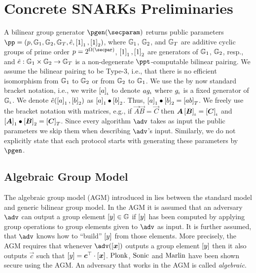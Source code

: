 \section{Concrete SNARKs Preliminaries}

A bilinear group generator $\pgen (\secparam)$ returns public parameters $ \pp =
(p, \GRP_1, \GRP_2, \GRP_T, \pair, \gone{1}, \gtwo{1})$, where $\mathbb{G}_1$,
$\mathbb{G}_2$, and $\mathbb{G}_T$ are additive cyclic groups of prime order $p = 2^{\Omega
  (\secpar)}$, $\left[1\right]_{1}, \left[1\right]_{2}$ are generators of $\mathbb{G}_1$, $\mathbb{G}_2$, resp.,
and $\hat{e}: \mathbb{G}_1 \times \mathbb{G}_2 \to \mathbb{G}_T$ is a non-degenerate
$\ppt$-computable bilinear pairing. We assume the bilinear pairing to be Type-3,
i.e., that there is no efficient isomorphism from $\mathbb{G}_1$ to $\mathbb{G}_2$ or from
$\mathbb{G}_2$ to $\mathbb{G}_1$. We use the by now standard bracket notation, i.e., we
write $\left[a\right]_{\iota}$ to denote $a g_{\iota}$ where $g_{\iota}$ is a fixed generator
of $\mathbb{G}_{\iota}$. We denote $\hat{e} (\left[a\right]_{1}, \left[b\right]_{2})$ as $\left[a\right]_{1} \bullet
\left[b\right]_{2}$. Thus, $\left[a\right]_{1} \bullet \left[b\right]_{2} = \left[a b\right]_{T}$. We freely use the
bracket notation with matrices, e.g., if $\vec{A} \vec{B} = \vec{C}$ then
$\vec{A} \grpgi{\vec{B}} = \grpgi{\vec{C}}$ and $\gone{\vec{A}}\bullet
\gtwo{\vec{B}} = \gtar{\vec{C}}$. Since every algorithm $\adv$ takes as input
the public parameters we skip them when describing $\adv$'s input. Similarly, we
do not explicitly state that each protocol starts with generating these
parameters by $\pgen$.

\subsection{Algebraic Group Model}
The algebraic group model (AGM) introduced in \cite{C:FucKilLos18} lies between the
standard model and generic bilinear group model. In the AGM it is assumed that an
adversary $\adv$ can output a group element $\left[y\right] \in \mathbb{G}$ if $\left[y\right]$ has
been computed by applying group operations to group elements given to $\adv$ as
input. It is further assumed, that $\adv$ knows how to ``build'' $\left[y\right]$ from
those elements. More precisely, the AGM requires that whenever $\adv(\gnone{\vec{x}})$
outputs a group element $\left[y\right]$ then it also outputs $\vec{c}$ such that
$\gnone{y} = \vec{c}^\top \cdot \gnone{\vec{x}}$. $\textnormal{{Plonk}}$, ${\textnormal{{Sonic}}}$ and ${\textnormal{{Marlin}}}$
have been shown secure using the AGM. An adversary that works in the AGM is called
\emph{algebraic}.

